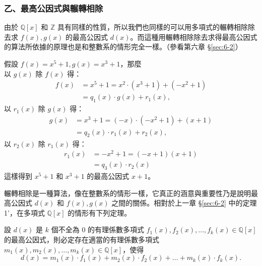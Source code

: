 \subsubsection*{乙、最高公因式與輾轉相除}\label{subsec:7-1-b}

由於 $\mathbb{Q}[x]$ 和 $\mathbb{Z}$ 具有同樣的性質，所以我們也同樣的可以用多項式的輾轉相除除去求 $f(x), g(x)$ 的最高公因式 $d(x)$。而這種用輾轉相除除去求得最高公因式的算法所依據的原理也是和整數系的情形完全一樣。（參看第六章 \S\ref{sec:6-2}）

\begin{example}\label{ex:7-1-3}
假設 $f(x) = x^5+1, g(x) = x^3+1$，那麼\\
以 $g(x)$ 除 $f(x)$ 得：
\begin{align*}
  f(x) &= x^5+1 = x^2 \cdot (x^3+1) + (-x^2+1) \\
  &= q_1(x) \cdot g(x) + r_1(x),
\end{align*}
以 $r_1(x)$ 除 $g(x)$ 得：
\begin{align*}
  g(x) &= x^3+1 = (-x) \cdot (-x^2+1) + (x+1) \\
  &= q_2(x) \cdot r_1(x) + r_2(x),
\end{align*}
以 $r_2(x)$ 除 $r_1(x)$ 得：
\begin{align*}
  r_1(x) &= -x^2+1 = (-x+1)(x+1) \\
  &= q_3(x) \cdot r_2(x)
\end{align*}
這樣得到 $x^5+1$ 和 $x^3+1$ 的最高公因式 $x+1$。
\end{example}

輾轉相除是一種算法，像在整數系的情形一樣，它真正的涵意與重要性乃是說明最高公因式 $d(x)$ 和 $f(x), g(x)$ 之間的關係。相對於上一章 \S\ref{sec:6-2} 中的定理 1'，在多項式 $\mathbb{Q}[x]$ 的情形有下列定理。

\begin{theorem}\label{thm:poly_bezout}
設 $d(x)$ 是 $k$ 個不全為 $0$ 的有理係數多項式 $f_1(x), f_2(x), \dots, f_k(x) \in \mathbb{Q}[x]$ 的最高公因式，則必定存在適當的有理係數多項式 $m_1(x), m_2(x), \dots, m_k(x) \in \mathbb{Q}[x]$，使得
\begin{equation*}
  d(x) = m_1(x) \cdot f_1(x) + m_2(x) \cdot f_2(x) + \dots + m_k(x) \cdot f_k(x).
\end{equation*}
\end{theorem}

